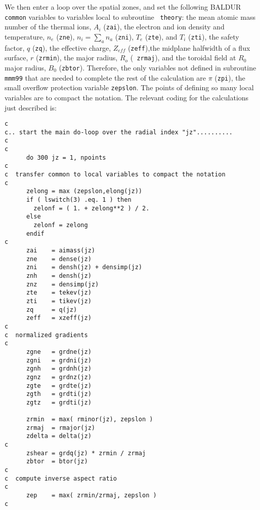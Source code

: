 \begin{verbatim}
\end{verbatim}

We then enter a loop over the spatial zones, and set the following
BALDUR {\tt common} variables to variables local to subroutine {\tt
theory}: the mean atomic mass number of the thermal ions, $A_{i}$
({\tt zai}), the electron and ion density and temperature, $n_{e}$
({\tt zne}), $n_{i}=\sum_{a}n_{a}$ ({\tt zni}), $T_{e}$ ({\tt zte}),
and $T_{i}$ ({\tt zti}), the safety factor, $q$ ({\tt zq}), the
effective charge, $Z_{eff}$ ({\tt zeff}),the midplane halfwidth of a
flux surface, $r$ ({\tt zrmin}), the major radius, $R_{o}$ ({\tt
zrmaj}), and the toroidal field at $R_0$ major radius, $B_{0}$
({\tt zbtor}).  Therefore, the only variables not defined in
subroutine {\tt mmm99} that are needed to complete the rest of the
calculation are $\pi$ ({\tt zpi}), the small overflow protection
variable {\tt zepslon}.  The points of defining so many local
variables are to compact the notation.  The relevant coding for the
calculations just described is:

\begin{verbatim}
c
c.. start the main do-loop over the radial index "jz"..........
c
c
      do 300 jz = 1, npoints
c
c  transfer common to local variables to compact the notation
c
      zelong = max (zepslon,elong(jz))
      if ( lswitch(3) .eq. 1 ) then
        zelonf = ( 1. + zelong**2 ) / 2.
      else
        zelonf = zelong
      endif
c
      zai    = aimass(jz)
      zne    = dense(jz)
      zni    = densh(jz) + densimp(jz)
      znh    = densh(jz)
      znz    = densimp(jz)
      zte    = tekev(jz)
      zti    = tikev(jz)
      zq     = q(jz)
      zeff   = xzeff(jz)
c
c  normalized gradients
c
      zgne   = grdne(jz)
      zgni   = grdni(jz)
      zgnh   = grdnh(jz)
      zgnz   = grdnz(jz)
      zgte   = grdte(jz)
      zgth   = grdti(jz)
      zgtz   = grdti(jz)

      zrmin  = max( rminor(jz), zepslon )
      zrmaj  = rmajor(jz)
      zdelta = delta(jz)
c
      zshear = grdq(jz) * zrmin / zrmaj
      zbtor  = btor(jz)
c
c  compute inverse aspect ratio
c
      zep    = max( zrmin/zrmaj, zepslon )
c
\end{verbatim}


